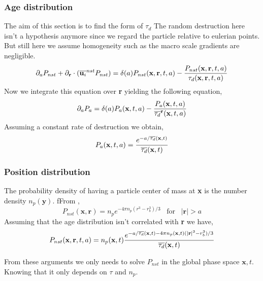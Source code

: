 \subsubsection{Age distribution}
The aim of this section is to find the form of $\tau_d$
The random destruction here isn't a hypothesis anymore since we regard the particle relative to eulerian points. 
But still here we assume homogeneity such as the macro scale gradients are negligible. 
\begin{align*}
    \partial_a P_{nst}
    + \partial_\textbf{r}\cdot  ( \overline{\textbf{u}_i}^{nst} P_{nst}) 
    &= \delta(a)P_{nst}(\textbf{x},\textbf{r},t,a)
    - \frac{P_{nst}(\textbf{x},\textbf{r},t,a)}
    {\tau_d(\textbf{x},\textbf{r},t,a)}\\
\end{align*} 
Now we integrate this equation over \textbf{r} yielding the following equation, 
\begin{align*}
    \partial_a P_{a}
    &= \delta(a)P_{a}(\textbf{x},t,a)
    - \frac{P_{a}(\textbf{x},t,a)}
    {\overline{\tau_d}^\textbf{r}(\textbf{x},t,a)}\\
\end{align*} 
Assuming a constant rate of destruction we obtain, 
\begin{align*}
    P_a(\textbf{x},t, a)  
    =\frac{e^{-a/\overline{\tau_d}(\textbf{x},t)}}{\overline{\tau_d}(\textbf{x},t)}
\end{align*} 
\subsubsection{Position distribution}
The probability density of having a particle center of mass at \textbf{x} is the number density $n_p(\textbf{y})$. 
fFrom \citet{zhang2021ensemble}, 
\begin{equation}
    P_{nst}(\textbf{x},\textbf{r})
    = n_p e^{-4\pi n_p (r^3- r_b^3)/3}
\;\;\;
\text{for}
\;\;\;
|\textbf{r}| > a
\end{equation}
Assuming that the age distribution isn't correlated with \textbf{r} we have, 
\begin{equation}
    P_{nst}(\textbf{x},\textbf{r},t,a)
    = n_p(\textbf{x},t) 
    \frac{e^{-a/\overline{\tau_d}(\textbf{x},t) -4\pi n_p(\textbf{x},t) (|\textbf{r}|^3- r_b^3)/3}}{\overline{\tau_d}(\textbf{x},t)}
\end{equation}

From these arguments we only needs to solve $P_{nst}$ in the global phase space $\textbf{x},t$. 
Knowing that it only depends on $\tau$ and $n_p$. 
